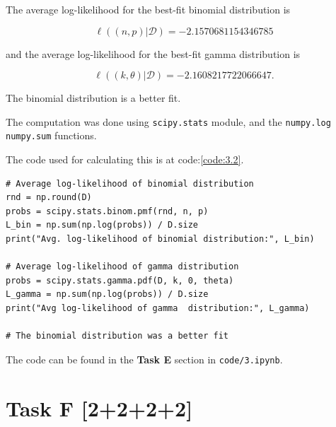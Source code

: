 
The average log-likelihood for the best-fit binomial distribution is

\begin{equation}
    \ell((n, p)|\mathcal{D}) = -2.1570681154346785
\end{equation}

and the average log-likelihood for the best-fit gamma distribution is

\begin{equation}
    \ell((k, \theta)|\mathcal{D}) = -2.1608217722066647.
\end{equation}

The binomial distribution is a better fit.

\vspace{10pt}
The computation was done using \texttt{scipy.stats} module, and the
\texttt{numpy.log} \texttt{numpy.sum} functions.

The code used for calculating this is at code:\ref{code:3.2}.

\begin{lstlisting}[caption={Average log-likelihood}, label={code:3.2}]
# Average log-likelihood of binomial distribution
rnd = np.round(D)
probs = scipy.stats.binom.pmf(rnd, n, p)
L_bin = np.sum(np.log(probs)) / D.size
print("Avg. log-likelihood of binomial distribution:", L_bin)

# Average log-likelihood of gamma distribution
probs = scipy.stats.gamma.pdf(D, k, 0, theta)
L_gamma = np.sum(np.log(probs)) / D.size
print("Avg log-likelihood of gamma  distribution:", L_gamma)

# The binomial distribution was a better fit
\end{lstlisting}

The code can be found in the \textbf{Task E} section in \texttt{code/3.ipynb}.

\section*{\colS{$\S$} Task F \hfill \normalfont \large [2+2+2+2]}

